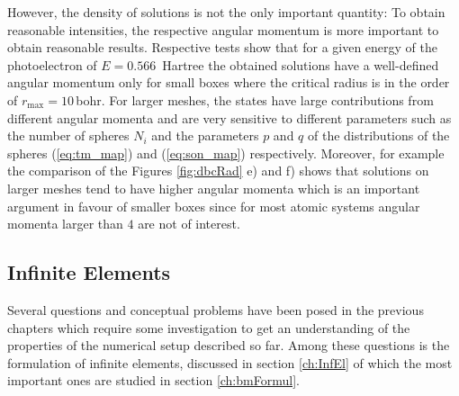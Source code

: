 However, the density of solutions is not the only important quantity: To obtain reasonable intensities, the respective angular momentum is more important to obtain reasonable results.
Respective tests show that for a given energy of the photoelectron of $E=0.566\,$ Hartree the obtained solutions have a well-defined angular momentum only for small boxes where the critical radius is in the order of $r_\text{max}=10\,$bohr.
For larger meshes, the states have large contributions from different angular momenta and are very sensitive to different parameters such as the number of spheres $N_i$ and the parameters $p$ and $q$ of the distributions of the spheres (\ref{eq:tm_map}) and (\ref{eq:son_map}) respectively.
Moreover, for example the comparison of the Figures \ref{fig:dbcRad} e) and f) shows that solutions on larger meshes tend to have higher angular momenta which is an important argument in favour of smaller boxes since for most atomic systems angular momenta larger than $4$ are not of interest.


\subsection{Infinite Elements}
\label{sec:iBCbench}
Several questions and conceptual problems have been posed in the previous chapters which require some investigation to get an understanding of the properties of the numerical setup described so far.
Among these questions is the formulation of infinite elements, discussed in section \ref{ch:InfEl} of which the most important ones are studied in section \ref{ch:bmFormul}.

